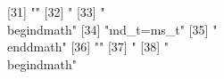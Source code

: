[31] ""                                                                                                                                                                                                                                                                                                                                            
[32] "%
[33] "\\begin{dmath}"                                                                                                                                                                                                                                                                                                                              
[34] "{md_{t}}={ms_{t}}"                                                                                                                                                                                                                                                                                                                           
[35] "\\end{dmath}"                                                                                                                                                                                                                                                                                                                                
[36] ""                                                                                                                                                                                                                                                                                                                                            
[37] "%
[38] "\\begin{dmath}"                                                                                                                                                                                                                                                                                                                              
